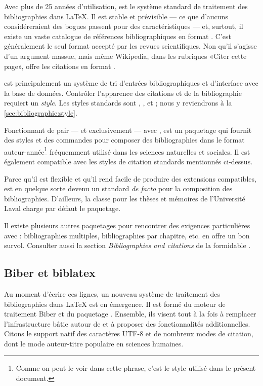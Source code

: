 Avec plus de 25 années d'utilisation, {\BibTeX} \citep{bibtex} est le
système standard de traitement des bibliographies dans {\LaTeX}. Il
est stable et prévisible --- ce que d'aucuns considéreraient des
bogues passent pour des caractéristiques --- et, surtout, il existe un
vaste catalogue de références bibliographiques en format {\BibTeX}.
C'est généralement le seul format accepté par les revues
scientifiques. Non qu'il s'agisse d'un argument massue, mais même
Wikipedia, dans les rubriques «Citer cette page», offre les citations
en format {\BibTeX}.

{\BibTeX} est principalement un système de tri d'entrées
bibliographiques et d'interface avec la base de données. Contrôler
l'apparence des citations et de la bibliographie requiert un
\emph{style}. Les styles standards sont , ,
 et ; nous y reviendrons à la
\autoref{sec:bibliographie:style}.

Fonctionnant de pair --- et exclusivement --- avec {\BibTeX},
 \citep{natbib} est un paquetage qui fournit des styles et
des commandes pour composer des bibliographies dans le format
auteur-année\footnote{%
  Comme on peut le voir dans cette phrase, c'est le style utilisé dans
  le présent document.} %
fréquemment utilisé dans les sciences naturelles et sociales. Il est
également compatible avec les styles de citation standards mentionnés
ci-dessus.

Parce qu'il est flexible et qu'il rend facile de produire des
extensions compatibles,  est en quelque sorte devenu un
standard \emph{de facto} pour la composition des bibliographies.
D'ailleurs, la classe  pour les thèses et mémoires de
l'Université Laval charge par défaut le paquetage.

Il existe plusieurs autres paquetages pour rencontrer des exigences
particulières avec {\BibTeX}: bibliographies multiples, bibliographies
par chapitre, etc. \citet{Mori:bibliographies:2009} en offre un bon
survol. Consulter aussi la section \emph{Bibliographies and citations}
de la formidable %
.


\subsection{Biber et biblatex}
\label{sec:bibliographie:systeme:biblatex}

Au moment d'écrire ces lignes, un nouveau système de traitement des
bibliographies dans {\LaTeX} est en émergence. Il est formé du moteur
de traitement Biber \citep{biber} et du paquetage 
\citep{biblatex}. Ensemble, ils visent tout à la fois à remplacer
l'infrastructure bâtie autour de {\BibTeX} et à proposer des
fonctionnalités additionnelles. Citons le support natif des caractères
UTF-8 et de nombreux modes de citation, dont le mode
auteur-titre populaire en sciences humaines.

